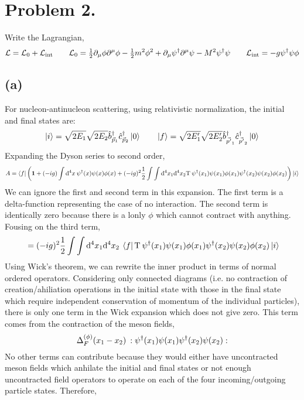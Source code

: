 \documentclass[12pt]{extarticle}
\begin{document}
\section*{Problem 2.}
Write the Lagrangian,
\[ \mathcal{L} = \mathcal{L}_0 + \mathcal{L}_{\mathrm{int}} \quad \quad \mathcal{L}_0 = \tfrac{1}{2} \partial_\mu \phi \partial^\mu \phi - \tfrac{1}{2} m^2 \phi^2 + \partial_\mu \psi^\dagger \partial^\mu \psi - M^2 \psi^\dagger \psi \quad \quad \mathcal{L}_{\mathrm{int}} = -g \psi^\dagger \psi \phi \] 
\subsection*{(a)}
For nucleon-antinucleon scattering, using relativistic normalization, the initial and final states are: 
\[\left| i \right> = \sqrt{2 E_1} \sqrt{2 E_2} \hat{b}^\dagger_{\vec{p}_1} \hat{c}^\dagger_{\vec{p}_2} \left| 0 \right>\quad \quad \left| f \right> = \sqrt{2 E_1'} \sqrt{2 E_2'} \hat{b}^\dagger_{\vec{p'}_1} \hat{c}^\dagger_{\vec{p'}_2} \left| 0 \right> \]
Expanding the Dyson series to second order,
\[ A = \left< f \right| \left( \mathbf{1} + (- ig) \int \mathrm{d}^4x \: \psi^\dagger(x) \psi(x) \phi(x) +  (- ig)^2 \frac{1}{2} \int\int \mathrm{d}^4x_1 \mathrm{d}^4x_2 \mathrm{T} \: \psi^\dagger(x_1) \psi(x_1) \phi(x_1) \psi^\dagger(x_2) \psi(x_2) \phi(x_2)  \right) \left| i \right> \]
We can ignore the first and second term in this expansion. The first term is a delta-function representing the case of no interaction. The second term is identically zero because there is a lonly $\phi$ which cannot contract with anything. Fousing on the third term,
\begin{align*}
& = (- ig)^2 \frac{1}{2} \int\int \mathrm{d}^4x_1 \mathrm{d}^4x_2 \: \left< f \right| \mathrm{T} \: \psi^\dagger(x_1) \psi(x_1) \phi(x_1) \psi^\dagger(x_2) \psi(x_2) \phi(x_2) \left| i \right> \\
\end{align*}
Using Wick's theorem, we can rewrite the inner product in terms of normal ordered operators. Considering only connected diagrams (i.e. no contraction of creation/ahiliation operations in the initial state with those in the final state which require independent conservation of momentum of the individual particles), there is only one term in the Wick expansion which does not give zero. This term comes from the contraction of the meson fields,
\[ \Delta_F^{(\phi)}(x_1 - x_2)\: :\psi^\dagger(x_1) \psi(x_1) \psi^\dagger(x_2) \psi(x_2):\] 
No other terms can contribute because they would either have uncontracted meson fields which anhilate the initial and final states or not enough uncontracted field operators to operate on each of the four incoming/outgoing particle states. Therefore,
\end{document}
